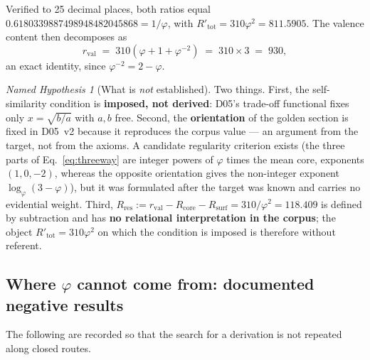 \documentclass[11pt,a4paper]{article}
\newcommand{\Rres}{R_{\mathrm{res}}}
\theoremstyle{plain}
\theoremstyle{definition}
\theoremstyle{remark}
\newtheorem{namedhyp}[theorem]{Named Hypothesis}
\newcommand{\rval}{r_{\mathrm{val}}}
\newcommand{\Rsurf}{R_{\mathrm{surf}}}
\begin{document}
Verified to 25 decimal places, both ratios equal $0.6180339887498948482045868=1/\varphi$, with $R'_{\mathrm{tot}}=310\varphi^2=811.5905$. The valence content then decomposes as
\begin{equation}
\rval \;=\; 310\left(\varphi + 1 + \varphi^{-2}\right) \;=\; 310\times 3 \;=\; 930 ,
\label{eq:threeway}
\end{equation}
an exact identity, since $\varphi^{-2}=2-\varphi$.

\begin{namedhyp}[What is \emph{not} established]
\label{hyp:notestablished}
Two things. First, the self-similarity condition is \textbf{imposed, not derived}: D05's trade-off functional fixes only $x=\sqrt{b/a}$ with $a,b$ free. Second, the \textbf{orientation} of the golden section is fixed in D05~v2 because it reproduces the corpus value --- an argument from the target, not from the axioms. A candidate regularity criterion exists (the three parts of Eq.~\eqref{eq:threeway} are integer powers of $\varphi$ times the mean core, exponents $(1,0,-2)$, whereas the opposite orientation gives the non-integer exponent $\log_\varphi(3-\varphi)$), but it was formulated after the target was known and carries no evidential weight. Third, $\Rres:=\rval-R_{\mathrm{core}}-\Rsurf=310/\varphi^2=118.409$ is defined by subtraction and has \textbf{no relational interpretation in the corpus}; the object $R'_{\mathrm{tot}}=310\varphi^2$ on which the condition is imposed is therefore without referent.
\end{namedhyp}

\subsection{Where \texorpdfstring{$\varphi$}{phi} cannot come from: documented negative results}
\label{subsec:phinegative}
The following are recorded so that the search for a derivation is not repeated along closed routes.
\end{document}

